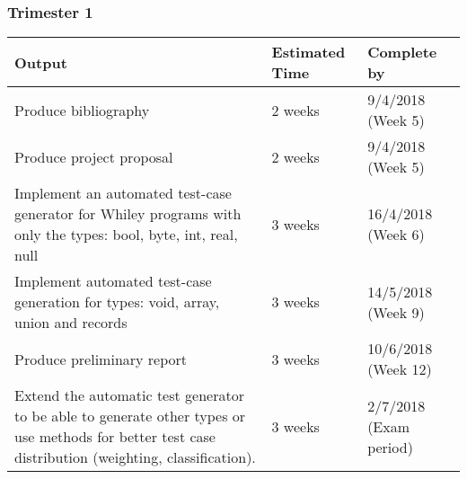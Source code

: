 \documentclass[11pt, a4paper, twoside, openright]{report}
\begin{document}
\subsubsection*{Trimester 1}
\begin{tabular}{ |p{10cm}|p{3cm}|p{2cm}| }
	\hline
	\textbf{Output} & \textbf{Estimated Time} & \textbf{Complete by}\\
	\hline
	Produce bibliography & 2 weeks & 9/4/2018 (Week 5) \\
	\hline
	Produce project proposal & 2 weeks & 9/4/2018 (Week 5) \\
	\hline
	Implement an automated test-case generator for Whiley programs with only the types:  bool, byte, int, real, null & 3 weeks & 16/4/2018 (Week 6) \\
	
	\hline
	Implement automated test-case generation for types: void, array, union and records & 3 weeks & 14/5/2018 (Week 9) \\
	\hline
	Produce preliminary report & 3 weeks & 10/6/2018 (Week 12) \\	
	\hline
	Extend the automatic test generator to be able to generate other types or use methods for better test case distribution (weighting, classification). & 3 weeks & 2/7/2018 (Exam period) \\
	\hline
\end{tabular}

\end{document}
